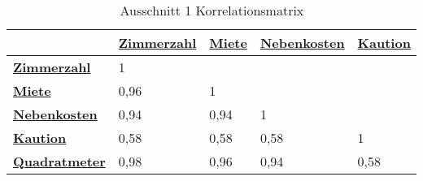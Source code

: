 
   \useunder{\uline}{\ul}{}
    \centering
    \begin{table}[h]
        \begin{tabular}{|l|l|l|l|l|}
        \hline
        {\ul \textbf{}}             & {\ul \textbf{Zimmerzahl}} & {\ul \textbf{Miete}} & {\ul \textbf{Nebenkosten}} & {\ul \textbf{Kaution}} \\ \hline
        {\ul \textbf{Zimmerzahl}}   & 1                         &                      &                            &                        \\ \hline
        {\ul \textbf{Miete}}        & 0,96                      & 1                    &                            &                        \\ \hline
        {\ul \textbf{Nebenkosten}}  & 0,94                      & 0,94                 & 1                          &                        \\ \hline
        {\ul \textbf{Kaution}}      & 0,58                      & 0,58                 & 0,58                       & 1                      \\ \hline
        {\ul \textbf{Quadratmeter}} & 0,98                      & 0,96                 & 0,94                       & 0,58                   \\ \hline
        \end{tabular}
        \caption{Ausschnitt 1 Korrelationsmatrix}
        \label{tab:korr1}
    \end{table}

\useunder{\uline}